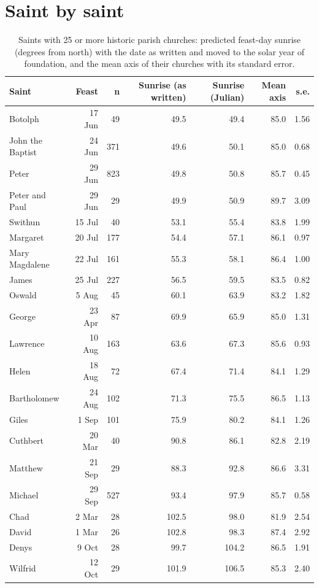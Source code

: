 \documentclass[11pt,a4paper]{article}
\begin{document}
\section{Saint by saint}
\begin{longtable}{lrrrrrr}\caption{Saints with 25 or more historic parish churches: predicted feast-day sunrise (degrees from north) with the date as written and moved to the solar year of foundation, and the mean axis of their churches with its standard error.}\label{tab:saints}\\
\toprule Saint & Feast & n & Sunrise (as written) & Sunrise (Julian) & Mean axis & s.e.\\\midrule\endhead
Botolph & 17 Jun & 49 & 49.5 & 49.4 & 85.0 & 1.56\\
John the Baptist & 24 Jun & 371 & 49.6 & 50.1 & 85.0 & 0.68\\
Peter & 29 Jun & 823 & 49.8 & 50.8 & 85.7 & 0.45\\
Peter and Paul & 29 Jun & 29 & 49.9 & 50.9 & 89.7 & 3.09\\
Swithun & 15 Jul & 40 & 53.1 & 55.4 & 83.8 & 1.99\\
Margaret & 20 Jul & 177 & 54.4 & 57.1 & 86.1 & 0.97\\
Mary Magdalene & 22 Jul & 161 & 55.3 & 58.1 & 86.4 & 1.00\\
James & 25 Jul & 227 & 56.5 & 59.5 & 83.5 & 0.82\\
Oswald & 5 Aug & 45 & 60.1 & 63.9 & 83.2 & 1.82\\
George & 23 Apr & 87 & 69.9 & 65.9 & 85.0 & 1.31\\
Lawrence & 10 Aug & 163 & 63.6 & 67.3 & 85.6 & 0.93\\
Helen & 18 Aug & 72 & 67.4 & 71.4 & 84.1 & 1.29\\
Bartholomew & 24 Aug & 102 & 71.3 & 75.5 & 86.5 & 1.13\\
Giles & 1 Sep & 101 & 75.9 & 80.2 & 84.1 & 1.26\\
Cuthbert & 20 Mar & 40 & 90.8 & 86.1 & 82.8 & 2.19\\
Matthew & 21 Sep & 29 & 88.3 & 92.8 & 86.6 & 3.31\\
Michael & 29 Sep & 527 & 93.4 & 97.9 & 85.7 & 0.58\\
Chad & 2 Mar & 28 & 102.5 & 98.0 & 81.9 & 2.54\\
David & 1 Mar & 26 & 102.8 & 98.3 & 87.4 & 2.92\\
Denys & 9 Oct & 28 & 99.7 & 104.2 & 86.5 & 1.91\\
Wilfrid & 12 Oct & 29 & 101.9 & 106.5 & 85.3 & 2.40\\

\end{longtable}
\end{document}
